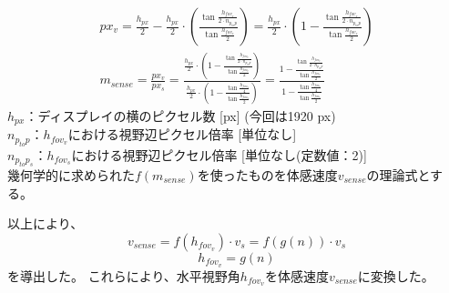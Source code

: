 \begin{enumerate}
\begin{align}
    px_v = \frac{h_{px}}{2}-\frac{h_{px}}{2}\cdot \left(\frac{\tan{\frac{h_{fov_v}}{2\cdot n_{p_{to}p}}}}{\tan{\frac{h_{fov_v}}{2}}}\right)=\frac{h_{px}}{2}\cdot \left(1-\frac{\tan{\frac{h_{fov_v}}{2\cdot n_{p_{to}p}}}}{\tan{\frac{h_{fov_v}}{2}}}\right)\\
    m_{sense} = \frac{px_v}{px_s}=\frac{\frac{h_{px}}{2}\cdot \left(1-\frac{\tan{\frac{h_{fov_v}}{2\cdot n_{p_{to}p}}}}{\tan{\frac{h_{fov_v}}{2}}}\right)}{\frac{h_{px}}{2}\cdot \left(1-\frac{\tan{\frac{h_{fov_s}}{4}}}{\tan{\frac{h_{fov_s}}{2}}}\right)}=\frac{1-\frac{\tan{\frac{h_{fov_v}}{2\cdot n_{p_{to}p}}}}{\tan{\frac{h_{fov_v}}{2}}}}{1-\frac{\tan{\frac{h_{fov_s}}{4}}}{\tan{\frac{h_{fov_s}}{2}}}}
  \end{align}
  $h_{px}$：ディスプレイの横のピクセル数 [px] (今回は1920 px)\\
  $n_{p_{to}p}$：$h_{fov_v}$における視野辺ピクセル倍率 [単位なし] \\
  $n_{p_{to}p_s}$：$h_{fov_s}$における視野辺ピクセル倍率 [単位なし(定数値：2)]\\
  幾何学的に求められた$f(m_{sense})$を使ったものを体感速度$v_{sense}$の理論式とする。
\end{enumerate}

以上により、$$v_{sense} = f(h_{fov_v})\cdot v_s = f(g(n)) \cdot v_s$$
$$h_{fov_v} = g(n)$$を導出した。
これらにより、水平視野角$h_{fov_v}$を体感速度$v_{sense}$に変換した。